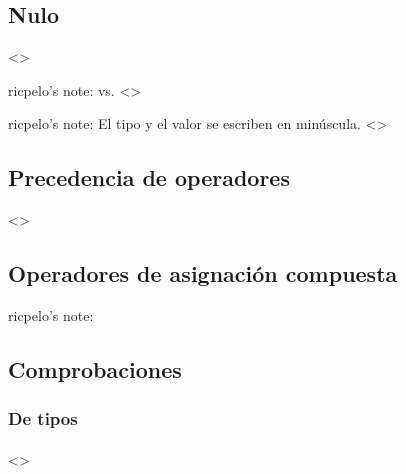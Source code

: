 \documentclass[a4paper,12pt,spanish]{sphinxmanual}
\begin{document}
\subsection{Nulo}
\label{\detokenize{php:nulo}}
\textless{}\textgreater{}

\begin{DUlineblock}{0em}
\item[] ricpelo’s note:  vs.
 \textless{}\textgreater{}
\item[] ricpelo’s note: El tipo  y el valor  se escriben en
minúscula. \textless{}\textgreater{}
\end{DUlineblock}


\subsection{Precedencia de operadores}
\label{\detokenize{php:precedencia-de-operadores}}
\textless{}\textgreater{}


\subsection{Operadores de asignación compuesta}
\label{\detokenize{php:operadores-de-asignacion-compuesta}}
ricpelo’s note:  


\subsection{Comprobaciones}
\label{\detokenize{php:comprobaciones}}

\subsubsection{De tipos}
\label{\detokenize{php:de-tipos}}

\paragraph{}
\label{\detokenize{php:gettype}}
\textless{}\textgreater{}
\end{document}
